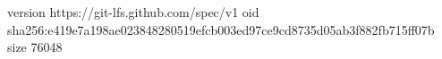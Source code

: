 version https://git-lfs.github.com/spec/v1
oid sha256:e419e7a198ae023848280519efcb003ed97ce9cd8735d05ab3f882fb715ff07b
size 76048
